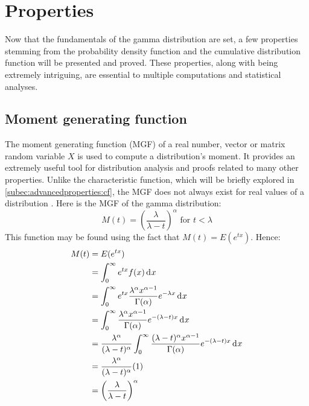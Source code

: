 \documentclass[12pt]{article}
\begin{document}
\pagebreak
\section{Properties}
Now that the fundamentals of the gamma distribution are set, a few properties stemming from the probability density
function and the cumulative distribution function will be presented and proved. These properties, along
with being extremely intriguing, are essential to multiple computations and statistical analyses.

\subsection{Moment generating function}\label{subsec:gamma:mgf}
The moment generating function (MGF) of a real number, vector or matrix random variable $X$ is used to compute a
distribution's moment. It provides an extremely useful tool for distribution analysis and proofs related to many other
properties. Unlike the characteristic function, which will be briefly explored in \autoref{subec:advancedproperties:cf},
the MGF does not always exist for real values of a distribution \cite{wikipediaMomentgeneratingFunction2022} . Here is
the MGF of the gamma distribution:
\begin{equation}
	M(t)=\left(\frac{\lambda}{\lambda-t}\right)^\alpha\text{ for }t<\lambda
\end{equation}
This function may be found using the fact that $M(t)=E(e^{tx})$. Hence:
\begin{equation}
	\begin{split}
		M(t)	&=	E(e^{tx})\\
				&=	\int^\infty_0 e^{tx}f(x)\mathop{}\!\mathrm{d^{}}x\\
				&=	\int^\infty_0 e^{tx}\frac{\lambda^\alpha x^{\alpha-1}}{\Gamma(\alpha)}e^{-\lambda x}\mathop{}\!\mathrm{d^{}}x\\
				&=	\int^\infty_0 \frac{\lambda^\alpha x^{\alpha-1}}{\Gamma(\alpha)}e^{-(\lambda-t) x}\mathop{}\!\mathrm{d^{}}x\\
				&=	\frac{\lambda^\alpha}{(\lambda-t)^\alpha}\int^\infty_0 \frac{(\lambda-t)^\alpha x^{\alpha-1}}{\Gamma(\alpha)}e^{-(\lambda-t) x}\mathop{}\!\mathrm{d^{}}x\\
				&=	\frac{\lambda^\alpha}{(\lambda-t)^\alpha}(1)\\
				&=	\left(\frac{\lambda}{\lambda-t}\right)^\alpha
	\end{split}
\end{equation}

\end{document}
